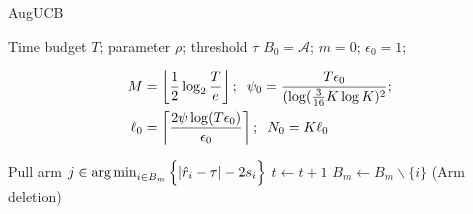 \begin{algorithm}[t!]
\caption{AugUCB}
\label{alg:augucb}
\begin{algorithmic}
 Time budget $T$; parameter $\rho$; 
  threshold $\tau$
 $B_{0}=\mathcal{A}$; $m=0$; $\epsilon_{0}=1$;
\begin{small}
\begin{align*}
M&=\left\lfloor \frac{1}{2}\log_{2} \frac{T}{e}\right\rfloor; 
\hspace{2mm}\psi_{0}=\frac{T\epsilon_{0}}{(\log(\frac{3}{16}K\log K)^2}; \\
\ell_{0}&=\left\lceil \frac{2\psi\log( T\epsilon_{0})}{\epsilon_{0}} \right\rceil;
\hspace{2mm}N_{0}=K\ell_{0}
\end{align*}
\end{small}
\vspace{-5mm}
\State {}
\State Pull arm $j\in\operatorname*{arg\,min}_{i\in B_{m}}\Big\lbrace |\hat{r}_{i} - \tau | - 2s_{i}\Big\rbrace$
\State $t\leftarrow t+1$ 
\vspace{-4mm}
\State {}
\vspace{-4mm}
\State {}
\State $B_m\leftarrow B_m\backslash\{i\}$\hspace{4mm} (Arm deletion)
\EndIf
\EndFor

\end{algorithmic}
\end{algorithm}
